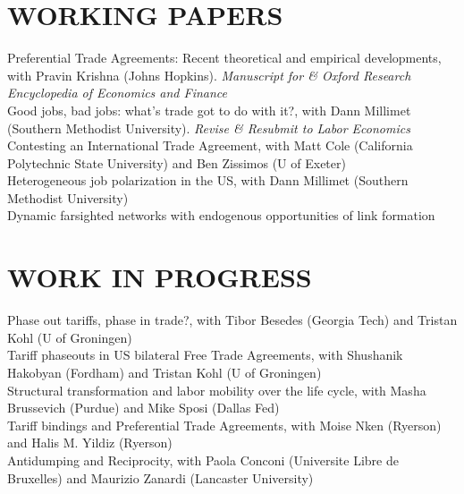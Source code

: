 \documentclass[11pt]{res}
\begin{document}
\begin{resume}
\section{WORKING PAPERS}\vspace{1.5mm}
{Preferential Trade Agreements: Recent theoretical and empirical developments}, with Pravin Krishna (Johns Hopkins). \emph{Manuscript for \& Oxford Research Encyclopedia of Economics and Finance}\vspace{1.5mm}\\
{Good jobs, bad jobs: what's trade got to do with it?}, with Dann Millimet (Southern Methodist University). \emph{Revise \& Resubmit to Labor Economics}\vspace{1.5mm}\\
{Contesting an International Trade Agreement}, with Matt Cole (California Polytechnic State University) and Ben Zissimos (U of Exeter) \vspace{1.5mm}\\
{Heterogeneous job polarization in the US}, with Dann Millimet (Southern Methodist University)\vspace{1.5mm}\\
{Dynamic farsighted networks with endogenous opportunities of link formation} \vspace{1.5mm}\\

\section{WORK IN PROGRESS}\vspace{1.5mm}
Phase out tariffs, phase in trade?, with Tibor Besedes (Georgia Tech) and Tristan Kohl (U of Groningen) \vspace{1.5mm}\\
Tariff phaseouts in US bilateral Free Trade Agreements, with Shushanik Hakobyan (Fordham) and Tristan Kohl (U of Groningen)\vspace{1.5mm}\\
Structural transformation and labor mobility over the life cycle, with Masha Brussevich (Purdue) and Mike Sposi (Dallas Fed)\vspace{1.5mm}\\
Tariff bindings and Preferential Trade Agreements, with Moise Nken (Ryerson) and Halis M. Yildiz (Ryerson)\vspace{1.5mm}\\
Antidumping and Reciprocity, with Paola Conconi (Universite Libre de Bruxelles) and Maurizio Zanardi (Lancaster University)\\


\end{resume}
\end{document}
